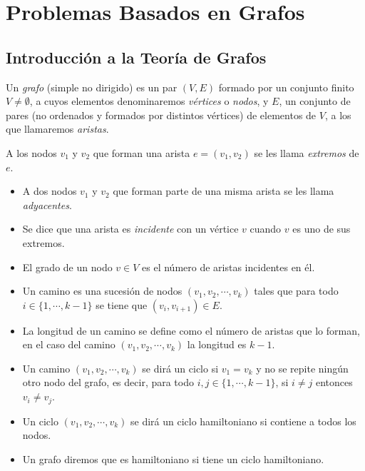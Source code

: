 \chapter{Problemas Basados en Grafos}\label{ch:preliminaresGrafos}

\section{Introducci\'on a la Teoría de Grafos}

\begin{definition}
	Un \textit{grafo} (simple no dirigido) es un par $(V,E)$ formado por un conjunto
	finito $V \neq \emptyset$, a cuyos elementos denominaremos \textit{vértices} o
	\textit{nodos}, y $E$, un conjunto de pares (no ordenados y formados por distintos
	vértices) de elementos de $V$, a los que llamaremos \textit{aristas}.

	A los nodos $v_1$ y $v_2$ que forman una arista $e = (v_1, v_2)$ se les llama
	\textit{extremos} de $e$.
\end{definition}


\begin{definition}[Conceptos]
	\begin{itemize}
	\item A dos nodos $v_1$ y $v_2$ que forman parte de una misma arista se les llama \textit{adyacentes}.
  \item Se dice que una arista es \textit{incidente} con un vértice $v$ cuando $v$ es uno de sus extremos.
	\item El grado de un nodo $v \in V$ es el n\'umero de aristas incidentes en \'el.
  \item Un camino es una sucesi\'on de nodos $(v_1,v_2,\cdots,v_k)$ tales que
	para todo $i \in \{1,\cdots,k-1\}$ se tiene que $(v_i,v_{i+1}) \in E$.
	\item La longitud de un camino se define como el n\'umero de aristas que lo forman,
	en el caso del camino $(v_1,v_2,\cdots,v_k)$ la longitud es $k-1$.
	\item Un camino $(v_1,v_2,\cdots,v_k)$ se dir\'a un ciclo si $v_1 = v_k$ y no
	se repite ning\'un otro nodo del grafo, es decir, para todo $i,j \in
	\{1,\cdots,k-1\}$, si $i\not= j$ entonces $v_i \not= v_j$.
	\item Un ciclo $(v_1,v_2,\cdots,v_k)$ se dir\'a un ciclo hamiltoniano si contiene
	a todos los nodos.
	\item Un grafo diremos que es hamiltoniano si tiene un ciclo hamiltoniano.
\end{itemize}
\end{definition}

